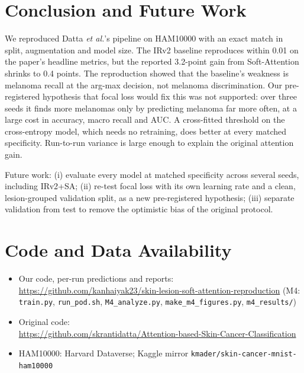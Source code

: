 \documentclass[conference]{IEEEtran}
\begin{document}
\section{Conclusion and Future Work}
We reproduced Datta \emph{et al.}'s pipeline on HAM10000 with an exact match in split, augmentation and model size. The IRv2 baseline reproduces within 0.01 on the paper's headline metrics, but the reported 3.2-point gain from Soft-Attention shrinks to 0.4 points. The reproduction showed that the baseline's weakness is melanoma recall at the arg-max decision, not melanoma discrimination. Our pre-registered hypothesis that focal loss would fix this was not supported: over three seeds it finds more melanomas only by predicting melanoma far more often, at a large cost in accuracy, macro recall and AUC. A cross-fitted threshold on the cross-entropy model, which needs no retraining, does better at every matched specificity. Run-to-run variance is large enough to explain the original attention gain.

Future work: (i) evaluate every model at matched specificity across several seeds, including IRv2+SA; (ii) re-test focal loss with its own learning rate and a clean, lesion-grouped validation split, as a new pre-registered hypothesis; (iii) separate validation from test to remove the optimistic bias of the original protocol.

\section*{Code and Data Availability}
\begin{itemize}
\item Our code, per-run predictions and reports:\\ \url{https://github.com/kanhaiyak23/skin-lesion-soft-attention-reproduction} (M4: \texttt{train.py}, \texttt{run\_pod.sh}, \texttt{M4\_analyze.py}, \texttt{make\_m4\_figures.py}, \texttt{m4\_results/})
\item Original code:\\ \url{https://github.com/skrantidatta/Attention-based-Skin-Cancer-Classification}
\item HAM10000: Harvard Dataverse; Kaggle mirror \texttt{kmader/skin-cancer-mnist-ham10000}
\end{itemize}
\end{document}
